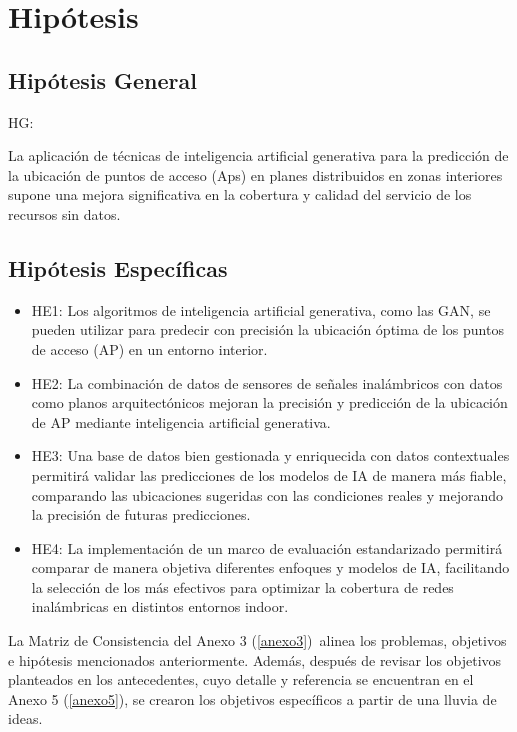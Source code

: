 \section{Hipótesis}

\subsection{Hipótesis General}
HG: \newcommand{\HipotesisGeneral}{
	La aplicación de técnicas de inteligencia artificial generativa para la predicción de la ubicación de puntos de acceso (Aps) en planes distribuidos en zonas interiores supone una mejora significativa en la cobertura y calidad del servicio de los recursos sin datos.
}
\HipotesisGeneral
\subsection{Hipótesis Específicas}
\newcommand{\Hone}{
	Los algoritmos de inteligencia artificial generativa, como las GAN, se pueden utilizar para predecir con precisión la ubicación óptima de los puntos de acceso (AP) en un entorno interior. 
}
\newcommand{\Htwo}{
	La combinación de datos de sensores de señales inalámbricos con datos como planos arquitectónicos mejoran la precisión y predicción de la ubicación de AP mediante inteligencia artificial generativa.
}
\newcommand{\Hthree}{
	Una base de datos bien gestionada y enriquecida con datos contextuales permitirá validar las predicciones de los modelos de IA de manera más fiable, comparando las ubicaciones sugeridas con las condiciones reales y mejorando la precisión de futuras predicciones.
}
\newcommand{\Hfour}{
	La implementación de un marco de evaluación estandarizado permitirá comparar de manera objetiva diferentes enfoques y modelos de IA, facilitando la selección de los más efectivos para optimizar la cobertura de redes inalámbricas en distintos entornos indoor.
}

\begin{itemize}
	\item HE1: \Hone
	\item HE2: \Htwo
	\item HE3: \Hthree
	\item HE4: \Hfour
\end{itemize}

La Matriz de Consistencia del Anexo 3 (\ref{anexo3}) alinea los problemas, objetivos e hipótesis mencionados anteriormente. Además, después de revisar los objetivos planteados en los antecedentes, cuyo detalle y referencia se encuentran en el Anexo 5 (\ref{anexo5}), se crearon los objetivos específicos a partir de una lluvia de ideas.

